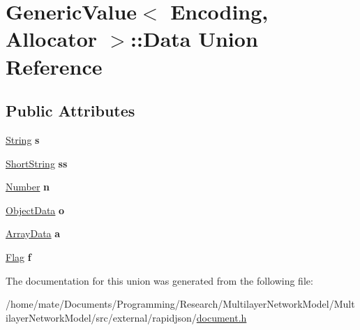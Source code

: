 \hypertarget{unionGenericValue_1_1Data}{}\section{Generic\+Value$<$ Encoding, Allocator $>$\+:\+:Data Union Reference}
\label{unionGenericValue_1_1Data}
\subsection*{Public Attributes}
\begin{DoxyCompactItemize}
\item 
\hyperlink{structGenericValue_1_1String}{String} {\bfseries s}\hypertarget{unionGenericValue_1_1Data_a6872a4b93763944063b425e6c001ed2b}{}\label{unionGenericValue_1_1Data_a6872a4b93763944063b425e6c001ed2b}

\item 
\hyperlink{structGenericValue_1_1ShortString}{Short\+String} {\bfseries ss}\hypertarget{unionGenericValue_1_1Data_a410e39a5dc296eb3b152b54193740e4c}{}\label{unionGenericValue_1_1Data_a410e39a5dc296eb3b152b54193740e4c}

\item 
\hyperlink{unionGenericValue_1_1Number}{Number} {\bfseries n}\hypertarget{unionGenericValue_1_1Data_a243007cce2f4b75bea3e3c1ee4c3c239}{}\label{unionGenericValue_1_1Data_a243007cce2f4b75bea3e3c1ee4c3c239}

\item 
\hyperlink{structGenericValue_1_1ObjectData}{Object\+Data} {\bfseries o}\hypertarget{unionGenericValue_1_1Data_af6417eca530fba0d8bd65d309628eb11}{}\label{unionGenericValue_1_1Data_af6417eca530fba0d8bd65d309628eb11}

\item 
\hyperlink{structGenericValue_1_1ArrayData}{Array\+Data} {\bfseries a}\hypertarget{unionGenericValue_1_1Data_aeac31cf55bf5a024cead5ecb63e4fd48}{}\label{unionGenericValue_1_1Data_aeac31cf55bf5a024cead5ecb63e4fd48}

\item 
\hyperlink{structGenericValue_1_1Flag}{Flag} {\bfseries f}\hypertarget{unionGenericValue_1_1Data_ad8572112da083c775ce21bcbca96b2ab}{}\label{unionGenericValue_1_1Data_ad8572112da083c775ce21bcbca96b2ab}

\end{DoxyCompactItemize}


The documentation for this union was generated from the following file\+:\begin{DoxyCompactItemize}
\item 
/home/mate/\+Documents/\+Programming/\+Research/\+Multilayer\+Network\+Model/\+Multilayer\+Network\+Model/src/external/rapidjson/\hyperlink{document_8h}{document.\+h}\end{DoxyCompactItemize}
